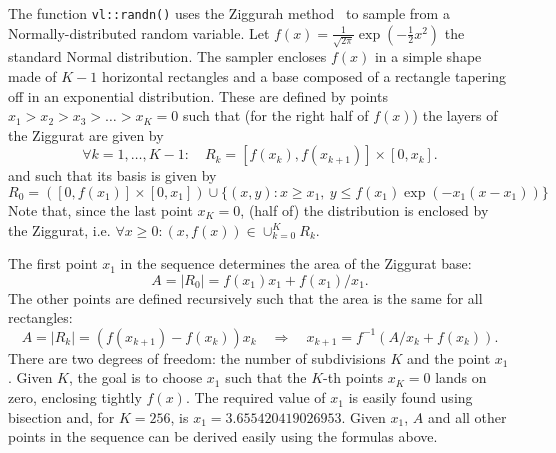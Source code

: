 The function \verb!vl::randn()! uses the Ziggurah method~\cite{marsaglia00the-ziggurat} to sample from a Normally-distributed random variable. Let $f(x) = \frac{1}{\sqrt{2\pi}} \exp\left(-\frac{1}{2}x^2\right)$ the standard Normal distribution. The sampler encloses $f(x)$ in a simple shape made of $K-1$ horizontal rectangles and a base composed of a rectangle tapering off in an exponential distribution. These are defined by points $x_1 > x_2 > x_3 > \dots > x_K=0$ such that (for the right half of $f(x)$) the layers of the Ziggurat are given by
\[
\forall k=1,\dots,K-1:
\quad R_k = [f(x_k),f(x_{k+1})] \times [0,x_k].
\]
and such that its basis is given by
\[
R_0 = ([0,f(x_{1})] \times [0,x_1]) \cup 
\{ (x,y) : x \geq x_1,\ y \leq f(x_1) \exp(-x_1(x - x_1)) \}
\]
Note that, since the last point $x_K=0$, (half of) the distribution is enclosed by the Ziggurat, i.e. $\forall x \geq 0:(x,f(x)) \in \cup_{k=0}^K R_k$.

The first point $x_1$ in the sequence determines the area of the Ziggurat base:
\[
A = |R_0| = f(x_1)x_1 + f(x_1)/x_1.
\]
The other points are defined recursively such that the area is the same for all rectangles:
\[
A = |R_k| = (f(x_{k+1}) - f(x_k))x_k
\quad\Rightarrow\quad
x_{k+1} = f^{-1} (A/x_k + f(x_k)).
\]
There are two degrees of freedom: the number of subdivisions $K$ and the point $x_1$. Given $K$, the goal is to choose $x_1$ such that the $K$-th points $x_K=0$ lands on zero, enclosing tightly $f(x)$. The required value of $x_1$ is easily found using bisection and, for $K=256$, is $x_1=3.655420419026953$. Given $x_1$, $A$ and all other points in the sequence can be derived easily using the formulas above.

